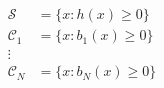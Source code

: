 \documentclass[preview]{standalone}
\begin{document}
\begin{align*}
\mathcal{S} &= \{ x : h(x) \geq 0 \}\\ \mathcal{C}_1 &= \{ x : b_1(x) \geq 0 \}\\ \vdots\\ \mathcal{C}_N &= \{ x : b_N(x) \geq 0 \}
\end{align*}
\end{document}
